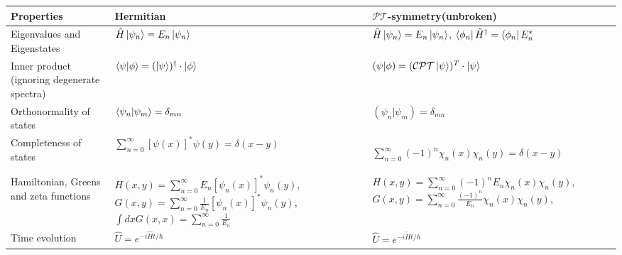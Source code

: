 \documentclass[12pt, a4paper]{report}
\newcommand\PT{\(\mathcal{PT}\)}
\begin{document}
{\renewcommand{\arraystretch}{2}
\noindent\begin{tabularx}{1.1\textwidth} { 
  | >{\raggedright\arraybackslash}X 
  | >{\raggedright\arraybackslash}X 
  | >{\raggedright\arraybackslash}X | }
 \hline
  \textbf{Properties} 
  & \textbf{Hermitian} 
  & \textbf{\PT-symmetry}\newline \small{(unbroken)} \\
   \hline
  Eigenvalues \newline and Eigenstates
  & $\hat{H}\ket{\psi_n} = E_n \ket{\psi_n}$ 
  & $\tilde{H}\ket{\psi_n} = E_n \ket{\psi_n}$, $\bra{\phi_n}\tilde{H}^{\dagger} = \bra{\phi_n}E_{n}^{*}$\vspace{0.001cm} \\
  \hline
  Inner product \newline \tiny{(ignoring degenerate spectra)}
  & $\braket{\psi|\phi} = (\ket{\psi})^{\dagger} \cdot \ket{\phi}$
  & $\left(\psi|\phi\right) = (\mathcal{CPT}\ket{\psi})^{T} \cdot \ket{\psi}$ \\
  \hline
  Orthonormality of states 
  & $\braket{\psi_n|\psi_m} = \delta_{mn}$ 
  & $\left(\psi_n|\psi_m\right) = \delta_{mn}$\\
  \hline
  Completeness of states 
  & $\sum\limits_{n = 0}^{\infty} [\psi(x)]^{*} \psi(y) = \delta(x-y)$
  & \begin{small}{$\sum\limits_{n = 0}^{\infty} (-1)^{n} \chi_n(x) \chi_n(y) = \delta(x-y)$}\end{small}\\
  \hline
  Hamiltonian, Greens \newline and zeta functions 
  & \small{$H(x,y) = \sum\limits_{n = 0}^{\infty} E_n [\psi_n(x)]^{*}\psi_n(y)$, 
  \newline $G(x,y) = \sum\limits_{n = 0}^{\infty} \frac{1}{E_n} [\psi_n(x)]^{*}\psi_n(y)$,
  \newline $\int dx G(x,x) =  \sum\limits_{n = 0}^{\infty} \frac{1}{E_n}$}
  & \small{$H(x,y) = \sum\limits_{n = 0}^{\infty}(-1)^{n} E_n \chi_n(x)\chi_n(y)$, \newline $G(x,y) = \sum\limits_{n = 0}^{\infty} \frac{(-1)^n}{E_n}\chi_n(x)\chi_n(y)$, \newline }\\

  \hline
  Time evolution
  & $\hat{U} = e^{-i\hat{H}t/\hbar}$
  & $\hat{U} = e^{-i\tilde{H}t/\hbar}$\\
  \hline
\end{tabularx}
}
\end{document}
